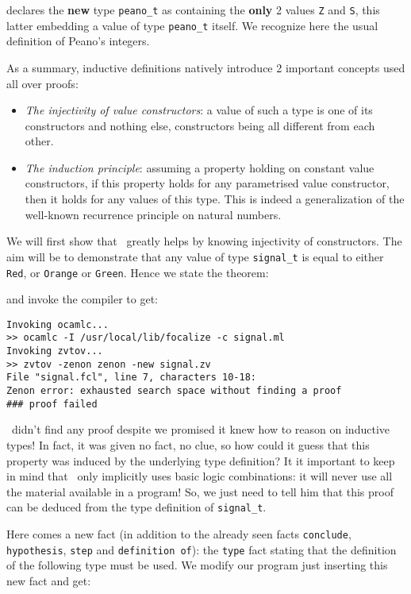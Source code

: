 \documentclass[11pt,a4paper,twoside,onecolumn,fullpage]{article}
\begin{document}
\noindent declares the {\bf new} type \lstinline"peano_t" as containing the
{\bf only} 2 values \lstinline"Z" and \lstinline"S", this latter
embedding a value of type \lstinline"peano_t" itself. We recognize
here the usual definition of Peano's integers.

\medskip
As a summary, inductive definitions natively introduce 2 important
concepts used all over proofs:
\begin{itemize}
\item {\em The injectivity of value constructors}: a value of such a type is
  one of its cons\-truc\-tors and nothing else, constructors being all
  different from each other.
\item {\em The induction principle}: assuming a property holding on constant
  value constructors, if this property holds for any parametrised
  value constructor, then it holds for any values of this type. This is
  indeed a generalization of the well-known recurrence principle on
  natural numbers.
\end{itemize}

\medskip
We will first show that \zenon\ greatly helps by knowing injectivity
of constructors. The aim will be to demonstrate that any value of type
\lstinline"signal_t" is equal to either \lstinline"Red", or \lstinline"Orange"
or \lstinline"Green". Hence we state the theorem:

{\scriptsize
}

\noindent and invoke the compiler to get:

{\scriptsize
\begin{verbatim}
Invoking ocamlc...
>> ocamlc -I /usr/local/lib/focalize -c signal.ml
Invoking zvtov...
>> zvtov -zenon zenon -new signal.zv
File "signal.fcl", line 7, characters 10-18:
Zenon error: exhausted search space without finding a proof
### proof failed
\end{verbatim}}

\zenon\ didn't find any proof despite we promised it knew how to
reason on inductive types! In fact, it was given no fact, no clue, so
how could it guess that this property was induced by the underlying
type definition? It it important to keep in mind that \zenon\ only implicitly uses
basic logic combinations: it will never use all the material
available in a program! So, we just need to tell him that this proof
can be deduced from the type definition of \lstinline"signal_t".

Here comes a new fact  (in addition to the already seen facts \lstinline"conclude",
\lstinline"hypothesis", \lstinline"step" and \lstinline"definition of"): the
\lstinline"type" fact stating that the definition of the following
type must be used. We modify our program just inserting this new fact
and get:
\end{document}
